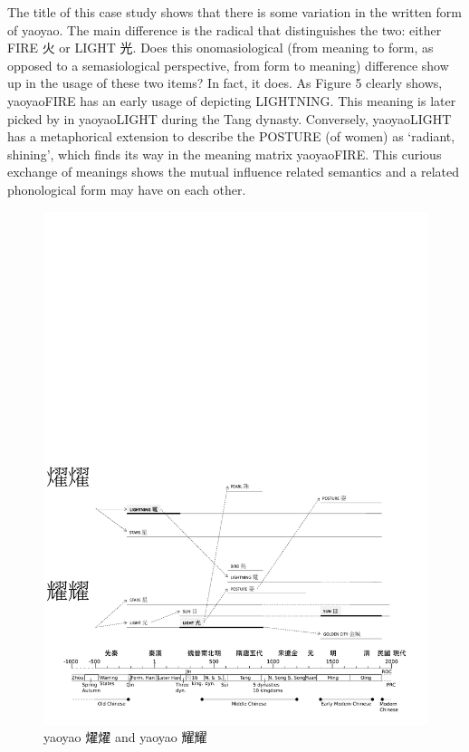 The title of this case study shows that there is some variation in the
written form of yaoyao. The main difference is the radical that
distinguishes the two: either FIRE 火 or LIGHT 光. Does this
onomasiological (from meaning to form, as opposed to a semasiological
perspective, from form to meaning) difference show up in the usage of
these two items? In fact, it does. As Figure 5 clearly shows, yaoyaoFIRE
has an early usage of depicting LIGHTNING. This meaning is later picked
by in yaoyaoLIGHT during the Tang dynasty. Conversely, yaoyaoLIGHT has a
metaphorical extension to describe the POSTURE (of women) as `radiant,
shining', which finds its way in the meaning matrix yaoyaoFIRE. This
curious exchange of meanings shows the mutual influence related
semantics and a related phonological form may have on each other.

\begin{figure}
\centering
\includegraphics{ideos/yaoyao.pdf}
\caption{\label{fig:yaoyao}yaoyao 燿燿 and yaoyao 耀耀}
\end{figure}

